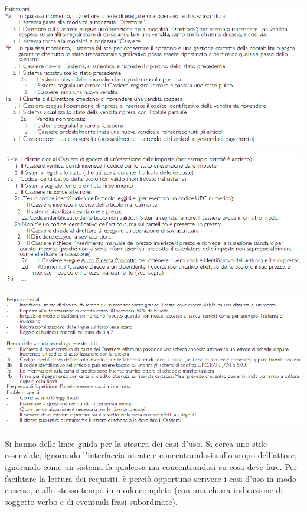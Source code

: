 \documentclass[a4paper,12pt, oneside]{book}
\begin{document}
\begin{center}
	\includegraphics[scale=0.57]{img/ca3.png}
\end{center}
\begin{center}
	\includegraphics[scale=0.57]{img/ca4.png}
\end{center}
\begin{center}
	\includegraphics[scale=0.57]{img/ca5.png}
\end{center}
Si hanno delle linee guida per la stesura dei casi d'uso. Si cerca uno stile essenziale, ignorando l'interfaccia utente e concentrandosi sullo scopo dell'attore, ignorando come un sistema fa qualcosa ma concentrandosi su cosa deve fare. Per facilitare la lettura dei requisiti, è perciò opportuno scrivere i casi d'uso in modo conciso, e allo stesso tempo in modo completo (con una chiara indicazione di soggetto  verbo e di eventuali frasi subordinate).\\
\end{document}
